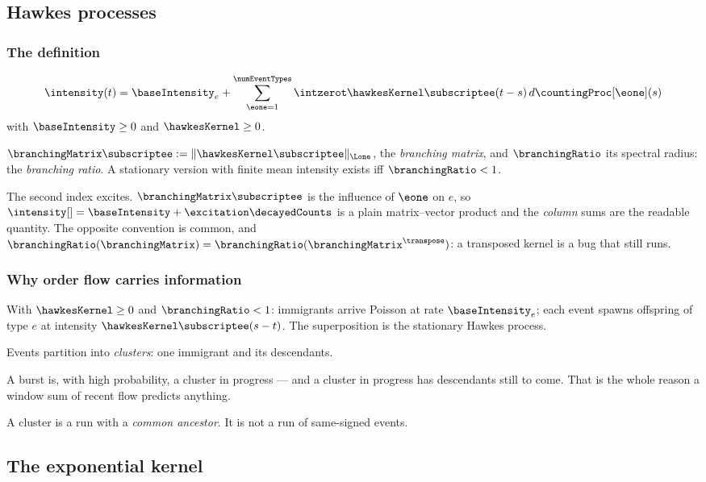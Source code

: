 \subsection{Hawkes processes}

\begin{frame}
  \frametitle{The definition}
\begin{equation*}
 \intensity(t) = \baseIntensity_e
 + \sum_{\eone=1}^{\numEventTypes}\intzerot \hawkesKernel\subscriptee(t-s) \, d\countingProc[\eone](s)
\end{equation*}
with $\baseIntensity \geq 0$ and $\hawkesKernel \geq 0$.

$\branchingMatrix\subscriptee := \Vert \hawkesKernel\subscriptee \Vert_{\Lone}$,
the \emph{branching matrix},
and $\branchingRatio$ its spectral radius: the \emph{branching ratio}.
A stationary version with finite mean intensity exists iff $\branchingRatio<1$.

\alert{The second index excites.}
$\branchingMatrix\subscriptee$ is the influence of $\eone$ on $e$,
so $\intensity[ ] = \baseIntensity + \excitation\decayedCounts$ is a plain matrix--vector
product and the \emph{column} sums are the readable quantity.
The opposite convention is common, and
$\branchingRatio(\branchingMatrix) = \branchingRatio(\branchingMatrix^{\transpose})$:
a transposed kernel is a bug that still runs.
\end{frame}

\begin{frame}
  \frametitle{Why order flow carries information}
\begin{prop}
 With $\hawkesKernel \geq 0$ and $\branchingRatio<1$:
 immigrants arrive Poisson at rate $\baseIntensity_e$;
 each event spawns offspring of type $e$ at intensity $\hawkesKernel\subscriptee(s-t)$.
 The superposition is the stationary Hawkes process.
\end{prop}

Events partition into \emph{clusters}: one immigrant and its descendants.

A burst is, with high probability, a cluster in progress ---
and a cluster in progress has descendants still to come.
That is the whole reason a window sum of recent flow predicts anything.

A cluster is a run with a \emph{common ancestor}.
It is not a run of same-signed events.
\end{frame}

\subsection{The exponential kernel}


